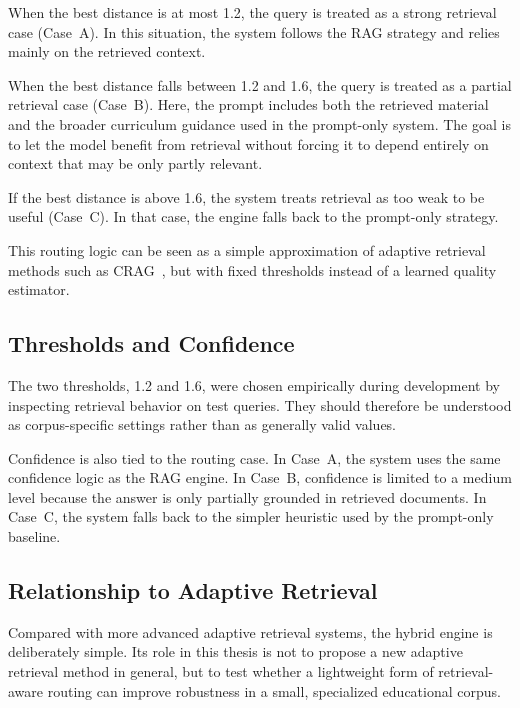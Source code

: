 When the best distance is at most 1.2, the query is treated as a strong
retrieval case (Case~A). In this situation, the system follows the RAG
strategy and relies mainly on the retrieved context. 

When the best distance falls between 1.2 and 1.6, the query is treated as a
partial retrieval case (Case~B). Here, the prompt includes both the
retrieved material and the broader curriculum guidance used in the
prompt-only system. The goal is to let the model benefit from retrieval
without forcing it to depend entirely on context that may be only partly
relevant.

If the best distance is above 1.6, the system treats retrieval as too weak
to be useful (Case~C). In that case, the engine falls back to the prompt-only strategy.

This routing logic can be seen as a simple approximation of adaptive
retrieval methods such as CRAG~\cite{yan2024practical_rag}, but with fixed
thresholds instead of a learned quality estimator.

\subsection{Thresholds and Confidence}

The two thresholds, 1.2 and 1.6, were chosen empirically during
development by inspecting retrieval behavior on test queries. They should
therefore be understood as corpus-specific settings rather than as generally
valid values.

Confidence is also tied to the routing case. In Case~A, the system uses the
same confidence logic as the RAG engine. In Case~B, confidence is limited to
a medium level because the answer is only partially grounded in retrieved
documents. In Case~C, the system falls back to the simpler heuristic used by
the prompt-only baseline.

\subsection{Relationship to Adaptive Retrieval}

Compared with more advanced adaptive retrieval systems, the hybrid engine is
deliberately simple. Its role in this thesis is not
to propose a new adaptive retrieval method in general, but to test whether a
lightweight form of retrieval-aware routing can improve robustness in a
small, specialized educational corpus.

    

